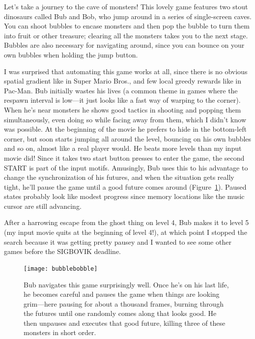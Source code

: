 \documentclass[twocolumn]{article}
\begin{document}
Let's take a journey to the cave of monsters! This lovely game
features two stout dinosaurs called Bub and Bob, who jump around in a
series of single-screen caves. You can shoot bubbles to encase
monsters and then pop the bubble to turn them into fruit or other
treasure; clearing all the monsters takes you to the next stage.
Bubbles are also necessary for navigating around, since you can bounce
on your own bubbles when holding the jump button.

I was surprised that automating this game works at all, since there is
no obvious spatial gradient like in Super Mario Bros., and few local
greedy rewards like in Pac-Man. Bub initially wastes his lives (a
common theme in games where the respawn interval is low---it just
looks like a fast way of warping to the corner). When he's near
monsters he shows good tactics in shooting and popping them
simultaneously, even doing so while facing away from them, which I
didn't know was possible. At the beginning of the movie he prefers to
hide in the bottom-left corner, but soon starts jumping all around the
level, bouncing on his own bubbles and so on, almost like a real
player would. He beats more levels than my input movie did! Since it
takes two start button presses to enter the game, the second START is
part of the input motifs. Amusingly, Bub uses this to his advantage to
change the synchronization of his futures, and when the situation gets
really tight, he'll pause the game until a good future comes around
(Figure~\ref{fig:bubblebobble}). Paused states probably look like
modest progress since memory locations like the music cursor are still
advancing.

After a harrowing escape from the ghost thing on level 4, Bub makes it
to level 5 (my input movie quits at the beginning of level 4!), at
which point I stopped the search because it was getting pretty pausey
and I wanted to see some other games before the SIGBOVIK deadline.

\begin{figure}[ht]
\begin{center}
\texttt{[image: bubblebobble]}
\end{center}\vspace{-0.1in}
\caption{Bub navigates this game surprisingly well. Once he's on his
  last life, he becomes careful and pauses the game when things are
  looking grim---here pausing for about a thousand frames, burning
  through the futures until one randomly comes along that looks good.
  He then unpauses and executes that good future, killing three of
  these monsters in short order.}
\label{fig:bubblebobble}
\end{figure}
\end{document}
